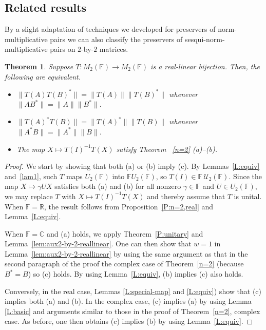 \documentclass[11pt]{article}
\newtheorem{theorem}{Theorem}[section]
\numberwithin{equation}{section}
\def\IF{{\mathbb F}}
\def\IC{{\mathbb C}}
\def\IR{{\mathbb R}}
\begin{document}
\subsection{Related results}

By a slight adaptation of techniques we developed for preservers of norm-multiplicative pairs we can also classify the preservers of sesqui-norm-multiplicative pairs on  $2$-by-$2$ matrices.

\begin{theorem}\label{T:n=2}
Suppose $T\colon M_2(\IF) \to M_2(\IF)$ is a real-linear bijection. Then, the following are equivalent.
	\begin{itemize}
		\item[{\rm (a)}] $\|T(A)T(B)^*\| = \|T(A)\| \|T(B)^*\|$ whenever $\|AB^*\| = \|A\| \|B^*\|$.
		\item[{\rm (b)}] $\|T(A)^*T(B)\| = \|T(A)^*\| \|T(B)\|$ whenever $\|A^*B\| = \|A^*\| \|B\|$.
		\item[{\rm (c)}] The map $X \mapsto T(I)^{-1} T(X)$ satisfy  Theorem {\rm~\ref{n=2} (a)--(b)}.
	\end{itemize}
\end{theorem}


\begin{proof}
We start by showing that both (a) or (b) imply (c). By Lemmas~\ref{L:equiv} and~\ref{lam1}, such $T$ maps $U_2(\IF)$ into $\IF U_2(\IF)$, so $T(I)\in\IF\,{\mathcal U}_2(\IF)$.  Since the map $X \mapsto \gamma UX$ satisfies both (a) and (b) for all nonzero $\gamma \in \IF$ and $U \in U_2(\IF)$, we may replace $T$ with $X\mapsto T(I)^{-1}T(X)$ and thereby assume that $T$ is unital.
When $\IF = \IR$, the result follows from Proposition~\ref{P:n=2,real} and Lemma~\ref{L:equiv}.

When $\IF = \IC$ and (a) holds, we apply Theorem~\ref{P:unitary} and Lemma~\ref{lem:aux2-by-2-reallinear}.  One can then show that $w=1$ in Lemma~\ref{lem:aux2-by-2-reallinear} by using the same argument as that in the second paragraph of the proof the complex case of Theorem~\ref{n=2} (because $B^*=B$) so (c) holds.  By using Lemma~\ref{L:equiv}, (b) implies (c) also holds.

Conversely, in the real case, Lemmas \ref{L:special-map} and \ref{L:equiv}) show that (c) implies both (a) and (b).  In the complex case, (c) implies (a) by using Lemma \ref{L:basic} and arguments similar to those in the proof of Theorem~\ref{n=2}, complex case.  As before, one then obtains (c) implies (b) by using Lemma~\ref{L:equiv}.
\end{proof}
\end{document}
